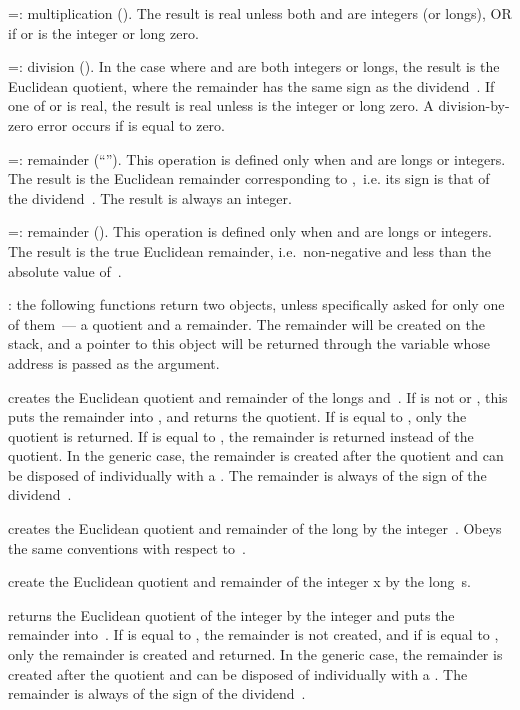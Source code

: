 \op=: multiplication (). The result is real unless both
 and  are integers (or longs), OR if  or  is the
integer or long zero.

\op=: division (). In the case where  and 
are both integers or longs, the result is the Euclidean quotient, where the
remainder has the same sign as the dividend~. If one of  or
 is real, the result is real unless  is the integer or long
zero. A division-by-zero error occurs if  is equal to zero.

\op=: remainder (``''). This operation is defined only
when  and  are longs or integers. The result is the Euclidean
remainder corresponding to ,~i.e. its sign is that of the
dividend~. The result is always an integer.

\op=: remainder (). This operation is defined only when
 and  are longs or integers. The result is the true Euclidean
remainder, i.e.~non-negative and less than the absolute value of~.

: the following functions return two objects,
unless specifically asked for only one of them~--- a quotient and a remainder.
The remainder will be created on the stack, and a  pointer to this
object will be returned through the variable whose address is passed as the
 argument.

 creates the Euclidean
quotient and remainder of the longs  and~. If  is not
 or , this puts the remainder into ,
and returns the quotient. If  is equal to , only the
quotient is returned. If  is equal to , the remainder
is returned instead of the quotient. In the generic case, the remainder is
created after the quotient and can be disposed of individually with a
. The remainder is always of the sign of the dividend~.

 creates the Euclidean
quotient and remainder of the long  by the integer~.
Obeys the same conventions with respect to~.

 create the Euclidean
quotient and remainder of the integer x by the long~s.

 returns the Euclidean quotient
of the integer  by the integer  and puts the remainder
into~. If  is equal to , the remainder is not
created, and if  is equal to  , only the remainder
is created and returned. In the generic case, the remainder is created
after the quotient and can be disposed of individually with a .
The remainder is always of the sign of the dividend~.

